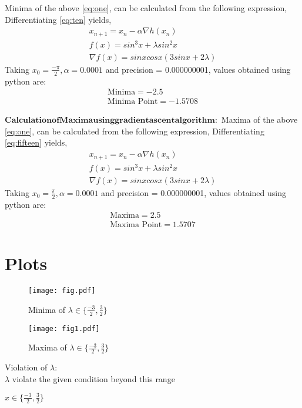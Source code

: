 \documentclass[journal,12pt,twocolumn]{IEEEtran}
\let\vec\mathbf
\begin{document}
{Minima of the above \eqref{eq:one}, can be calculated from the following expression,}
Differentiating \eqref{eq:ten} yields,
\begin{align}
       \boxed{x_{n+1} = x_n - \alpha \nabla h(x_n)}\\
       \label{eq:ten}
		f(x)= sin^3 x+\lambda sin^2 x \\ 
		\nabla f(x) = sinx cosx (3sinx+2\lambda) 
\end{align}
Taking $x_0=\frac{-\pi}{2},\alpha=0.0001$ and precision = 0.000000001, values obtained using python are:
    \begin{align}
        \boxed{\text{Minima} =-2.5}\\     
        \boxed{\text{Minima Point} = -1.5708}
    \end{align}
   
\small$\vec{Calculation of Maxima using gradient ascent algorithm:}$
{Maxima of the above \eqref{eq:one}, can be calculated from the following expression,}
Differentiating \eqref{eq:fifteen} yields,
\begin{align}
       \boxed{x_{n+1} = x_n - \alpha \nabla h(x_n)}\\
       \label{eq:fifteen}
	f(x)= sin^3 x+\lambda sin^2 x \\ 
	\nabla f(x) = sinx cosx (3sinx+2\lambda)
\end{align}
Taking $x_0=\frac{\pi}{2},\alpha=0.0001$ and precision = 0.000000001, values obtained using python are:
    \begin{align}
        \boxed{\text{Maxima} =2.5}\\     
        \boxed{\text{Maxima Point} = 1.5707}
    \end{align}
\section{\textbf{Plots}}
\begin{figure}
\texttt{[image: fig.pdf]}
\caption{Minima of $\lambda \in \{\frac{-3}{2},\frac{3}{2}\}$}
\label{fig:Figure}
\texttt{[image: fig1.pdf]}
\caption{Maxima of $\lambda \in \{\frac{-3}{2},\frac{3}{2}\}$}
\label{fig:Figure}
\end{figure}
Violation of $\lambda$:\\ 
$\lambda$ violate the given condition beyond this range 
\begin{center}
$x \in \{ \frac{-3}{2}, \frac{3}{2}\}$
\end{center}
 
\end{document}
